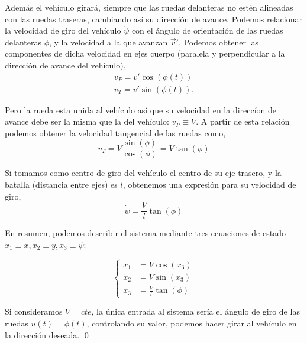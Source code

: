 \begin{example}
Además el vehículo girará, siempre que las ruedas delanteras no estén alineadas con las ruedas traseras, cambiando así su dirección de avance. Podemos relacionar la velocidad de giro del vehículo $\dot{\psi}$ con el ángulo de orientación de las ruedas delanteras $\phi$, y la velocidad a la que avanzan $\vec{v}'$.  Podemos obtener las componentes de dicha velocidad en ejes cuerpo (paralela y perpendicular a la dirección de avance del vehículo),
\begin{align}
v_{P} = v'\cos(\phi(t))\\
v_{T} = v'\sin(\phi(t)).
\end{align} 

Pero la rueda esta unida al vehículo así que su velocidad en la direccíon de avance debe ser la misma que la del vehículo: $v_P \equiv V$.  A partir de esta relación podemos obtener la velocidad tangencial de las ruedas como,
\begin{equation}
v_T = V\frac{\sin(\phi)}{\cos(\phi)} = V\tan(\phi)
\end{equation}

Si tomamos como centro de giro del vehículo el centro de su eje trasero, y la batalla (distancia entre ejes) es $l$, obtenemos una expresión para su velocidad de giro,
\begin{equation}
\dot{\psi} = \frac{V}{l}\tan(\phi)
\end{equation}

En resumen, podemos describir el sistema mediante tres ecuaciones de estado $x_1 \equiv x, x_2\equiv	y, x_3 \equiv \psi$:


\begin{equation}
	\begin{cases}
		\dot x_1 &=  V\cos(x_3)\\  
		\dot x_2 &=  V\sin(x_3)\\
		\dot x_3 &= \frac{V}{l}\tan(\phi)
	\end{cases}
\end{equation}

Si consideramos $V=cte$, la única entrada al sistema sería el ángulo de giro de las ruedas $u(t) = \phi(t)$, controlando su valor, podemos hacer girar al vehículo en la dirección deseada. \qed
\end{example}

